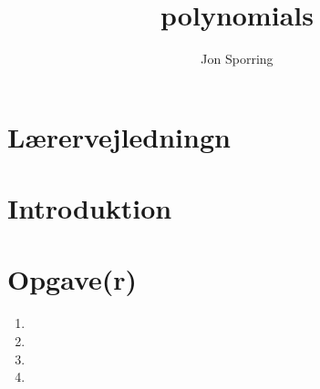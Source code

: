 \documentclass[a4paper,12pt]{article}
\title{polynomials}
\author{Jon Sporring}
\begin{document}
\maketitle

\section{Lærervejledningn}

\section{Introduktion}

\section{Opgave(r)}
\begin{enumerate}
\item 
\item 
\item 
\item 
\end{enumerate}
\end{document}
